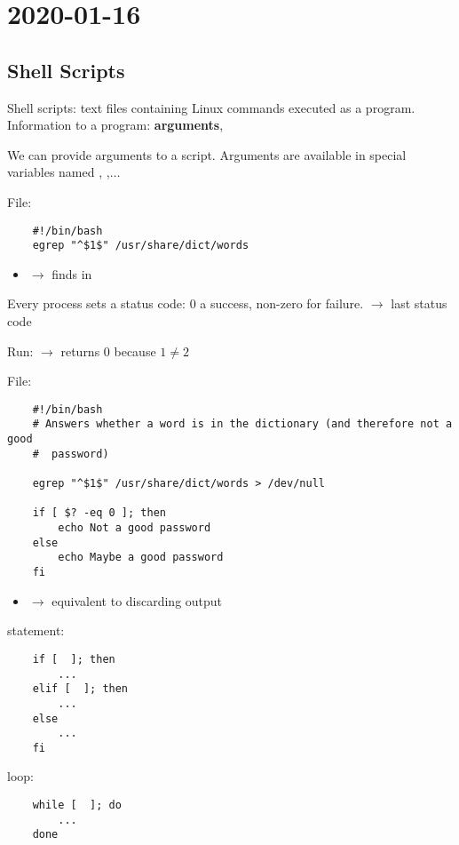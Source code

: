 \section{2020-01-16}
\subsection{Shell Scripts}
Shell scripts: text files containing Linux commands executed as a program.
Information to a program: \textbf{arguments}, 

We can provide arguments to a script. Arguments are available in special
variables named , ,$\ldots$

File: 
\begin{lstlisting}
    #!/bin/bash
    egrep "^$1$" /usr/share/dict/words
\end{lstlisting}
\begin{itemize}
    \item {} $ \rightarrow $ finds  in
\end{itemize}

Every process sets a status code: $ 0 $ a success, non-zero for failure.
 $ \rightarrow $ last status code

Run: \code{[ 1 -eq 2]}  $ \rightarrow $ returns $ 0 $ because $ 1\neq 2 $

File: 
\begin{lstlisting}
    #!/bin/bash
    # Answers whether a word is in the dictionary (and therefore not a good
    #  password)

    egrep "^$1$" /usr/share/dict/words > /dev/null

    if [ $? -eq 0 ]; then
        echo Not a good password
    else
        echo Maybe a good password
    fi
\end{lstlisting}
\begin{itemize}
    \item {} $ \rightarrow $ equivalent to discarding output
\end{itemize}

 statement:
\begin{lstlisting}
    if [  ]; then
        ...
    elif [  ]; then
        ...
    else
        ...
    fi
\end{lstlisting}

 loop:
\begin{lstlisting}
    while [  ]; do
        ...
    done
\end{lstlisting}

